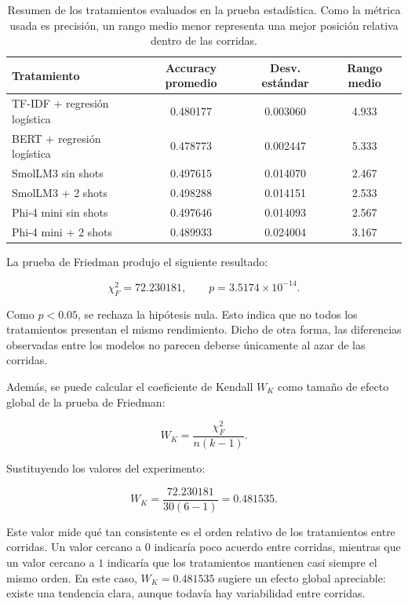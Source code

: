 \documentclass[12pt]{article}
\begin{document}
\begin{table}[H]
\centering
\begin{tabular}{lccc}
\toprule
Tratamiento & Accuracy promedio & Desv. estándar & Rango medio \\
\midrule
TF-IDF + regresión logística & 0.480177 & 0.003060 & 4.933 \\
BERT + regresión logística & 0.478773 & 0.002447 & 5.333 \\
SmolLM3 sin shots & 0.497615 & 0.014070 & 2.467 \\
SmolLM3 + 2 shots & 0.498288 & 0.014151 & 2.533 \\
Phi-4 mini sin shots & 0.497646 & 0.014093 & 2.567 \\
Phi-4 mini + 2 shots & 0.489933 & 0.024004 & 3.167 \\
\bottomrule
\end{tabular}
\caption{Resumen de los tratamientos evaluados en la prueba estadística. Como la métrica usada es
precisión, un rango medio menor representa una mejor posición relativa dentro de las corridas.}
\label{tab:stat-summary}
\end{table}

\clearpage

La prueba de Friedman produjo el siguiente resultado:

\begin{equation}
\chi^2_F = 72.230181,
\qquad
p = 3.5174 \times 10^{-14}.
\end{equation}

Como $p < 0.05$, se rechaza la hipótesis nula. Esto indica que no todos los tratamientos
presentan el mismo rendimiento. Dicho de otra forma, las diferencias observadas entre los modelos
no parecen deberse únicamente al azar de las corridas.

Además, se puede calcular el coeficiente de Kendall $W_K$ como tamaño de efecto global de la
prueba de Friedman:

\begin{equation}
W_K = \frac{\chi^2_F}{n(k-1)}.
\end{equation}

Sustituyendo los valores del experimento:

\begin{equation}
W_K =
\frac{72.230181}{30(6-1)}
=
0.481535.
\end{equation}

Este valor mide qué tan consistente es el orden relativo de los tratamientos entre corridas. Un
valor cercano a $0$ indicaría poco acuerdo entre corridas, mientras que un valor cercano a $1$
indicaría que los tratamientos mantienen casi siempre el mismo orden. En este caso, $W_K =
0.481535$ sugiere un efecto global apreciable: existe una tendencia clara, aunque todavía hay
variabilidad entre corridas.
\end{document}
